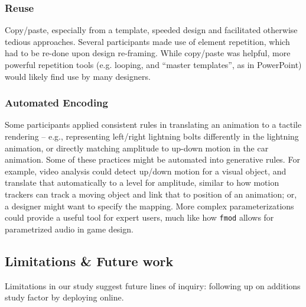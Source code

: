     \subsubsection{Reuse}
    Copy/paste, especially from a template, speeded  design and facilitated otherwise tedious approaches.
    Several participants made use of element repetition, which had to be re-done upon design re-framing.
    While copy/paste was helpful, more powerful repetition tools (e.g. looping, and ``master templates'', as in PowerPoint) would likely find use by many designers.
    
    \subsubsection{Automated Encoding}
    Some participants applied consistent rules in translating an animation to a tactile rendering -- e.g., representing left/right lightning bolts differently in the lightning animation, or directly matching amplitude to up-down motion in the car animation.
    Some of these practices might be automated into generative rules. 
    For example, video analysis could detect up/down motion for a visual object, and translate that automatically to a level for amplitude, similar to how motion trackers can track a moving object and link that to position of an animation; or, a designer might want to specify the mapping.
    More complex parameterizations could provide a useful tool for expert users, much like how {\tt fmod} allows for parametrized audio in game design.
    
    
\subsection{Limitations \& Future work}
Limitations in our study suggest future lines of inquiry: following up on additions study factor by deploying online.
%
%

%
